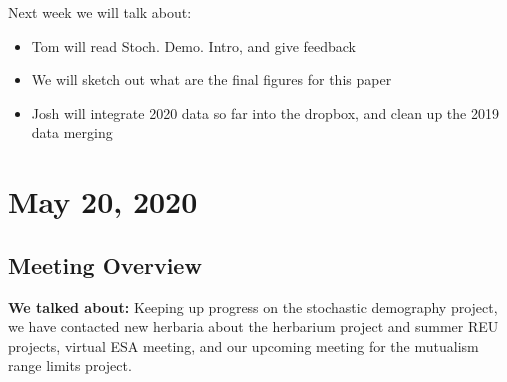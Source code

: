 \documentclass{article}
\begin{document}
Next week we will talk about:
\begin{itemize}
\item{Tom will read Stoch. Demo. Intro, and give feedback}
\item{We will sketch out what are the final figures for this paper}
\item{Josh will integrate 2020 data so far into the dropbox, and clean up the 2019 data merging}
\end{itemize}

\section*{May 20, 2020}
\subsection*{Meeting Overview}
\textbf{We talked about:}
Keeping up progress on the stochastic demography project, we have contacted new herbaria about the herbarium project and summer REU projects, virtual ESA meeting, and our upcoming meeting for the mutualism range limits project.
\end{document}
